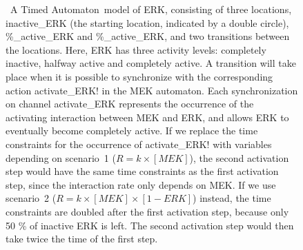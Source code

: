 \documentclass{bmcart}
\def\ta{Timed Automaton}
\begin{document}
\begin{backmatter}
\begin{figure}[!hb]
{{\bf \protect{}}~A \ta\ model of ERK, consisting of three locations, {\sf inactive\_ERK}
(the starting location, indicated by a double circle), {\%\_active\_ERK} and {\%\_active\_ERK},
and two transitions between the locations. Here, ERK has three activity levels: completely inactive, halfway active
and completely active.
A transition will take place when it is possible to synchronize with
the corresponding action {\sf activate\_ERK!} in the MEK automaton.
Each synchronization on channel {\sf activate\_ERK} represents the occurrence of the activating
interaction between MEK and ERK, and allows ERK to eventually become completely active. If we 
replace the time constraints for the occurrence of {\sf activate\_ERK!} with variables depending
on scenario~1 ($R = k \times [MEK]$), the second activation step would have the same time 
constraints as the first activation step, since the interaction rate only depends on MEK. If we use scenario~2
($R = k \times [MEK] \times [1 - ERK]$) instead, the time constraints are doubled after the first activation step, because only
50 \% of inactive ERK is left. The second activation step would then take twice the time of the first step.
}\label{fig:abstraction-mek-erk}
\end{figure}



\end{backmatter}
\end{document}
